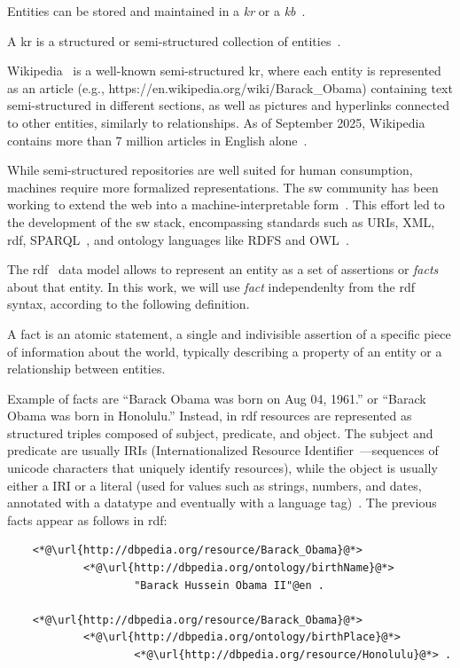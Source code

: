 Entities can be stored and maintained in a \emph{\acl{kr}} or a \emph{\acl{kb}}~\cite{entityorientedsearch2018balog}.
%
\begin{definition}[\Acl{kr}]
A \acf{kr} is a structured or semi-structured collection of entities~\cite{entityorientedsearch2018balog}.
\end{definition}

Wikipedia~\cite{wikipedia:wikipedia} is a well-known semi-structured \acl{kr}, where each entity is represented as an article (e.g., https://en.wikipedia.org/wiki/Barack\_Obama) containing text semi-structured in different sections, as well as pictures and hyperlinks connected to other entities, similarly to relationships. As of September 2025, Wikipedia contains more than 7 million articles in English alone~\cite{Wikipedia:SizeOfWikipedia}.

While semi-structured repositories are well suited for human consumption, machines require more formalized representations. The \Acl{sw} community has been working to extend the \acs{web} into a machine-interpretable form~\cite{entityorientedsearch2018balog,decker_sw_rdf_xml_roles_2000}. This effort led to the development of the \acl{sw} stack, encompassing standards such as URIs, XML, \acs{rdf}, SPARQL~\cite{prudhommeaux2008sparql}, and ontology languages like RDFS and OWL~\cite{entityorientedsearch2018balog}.

The \acf{rdf}~\cite{klyne2004rdf} data model allows to represent an entity as a set of assertions or \emph{facts} about that entity. In this work, we will use \emph{fact} independenlty from the \ac{rdf} syntax, according to the following definition.
\begin{definition}[Fact]
    A fact is an atomic statement, a single and indivisible assertion of a specific piece of information about the world, typically describing a property of an entity or a relationship between entities.
\end{definition}
Example of facts are ``Barack Obama was born on Aug 04, 1961.'' or ``Barack Obama was born in Honolulu.''
Instead, in \ac{rdf} resources are represented as structured triples composed of subject, predicate, and object. The subject and predicate are usually IRIs (Internationalized Resource Identifier~\cite{durst2005iri}---sequences of unicode characters that uniquely identify resources), while the object is usually either a IRI or a literal (used for values such as strings, numbers, and dates, annotated with a datatype and eventually with a language tag)~\cite{klyne2004rdf}.
%
The previous facts appear as follows in \ac{rdf}:
%
\begin{lstlisting}
    <*@\url{http://dbpedia.org/resource/Barack_Obama}@*>
            <*@\url{http://dbpedia.org/ontology/birthName}@*>
                    "Barack Hussein Obama II"@en .

    <*@\url{http://dbpedia.org/resource/Barack_Obama}@*>
            <*@\url{http://dbpedia.org/ontology/birthPlace}@*>
                    <*@\url{http://dbpedia.org/resource/Honolulu}@*> .
\end{lstlisting}

